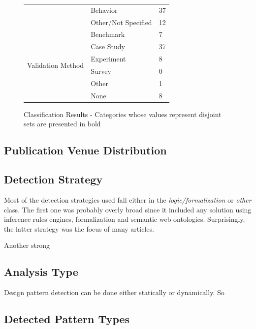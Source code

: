 \documentclass[letterpaper, 10 pt, conference]{ieeeconf}  %
\begin{document}
\begin{figure}
\begin{tabular}{ lll }
    & \multicolumn{1}{l}{Behavior}    & \multicolumn{1}{l}{37} \\
    & \multicolumn{1}{l}{Other/Not Specified}
                                       & \multicolumn{1}{l}{12} \\
    \hline
    \multirow{6}{*}{Validation Method}
    & \multicolumn{1}{l}{Benchmark}    & \multicolumn{1}{l}{7} \\
    & \multicolumn{1}{l}{Case Study}   & \multicolumn{1}{l}{37} \\
    & \multicolumn{1}{l}{Experiment}   & \multicolumn{1}{l}{8} \\
    & \multicolumn{1}{l}{Survey}       & \multicolumn{1}{l}{0} \\
    & \multicolumn{1}{l}{Other}        & \multicolumn{1}{l}{1} \\
    & \multicolumn{1}{l}{None}         & \multicolumn{1}{l}{8}
   \end{tabular}
   \caption{Classification Results - Categories whose values represent disjoint sets are presented in bold}

\end{figure}

\subsection{Publication Venue Distribution}


\subsection{Detection Strategy}

Most of the detection strategies used fall either in the 
\textit{logic/formalization} or \textit{other} class.
The first one was probably overly broad since it included any solution using
inference rules engines, formalization and semantic web ontologies.
Surprisingly, the latter strategy was the focus of many articles.

Another strong 


\subsection{Analysis Type}

Design pattern detection can be done either statically or dynamically.
So



\subsection{Detected Pattern Types}
\end{document}
